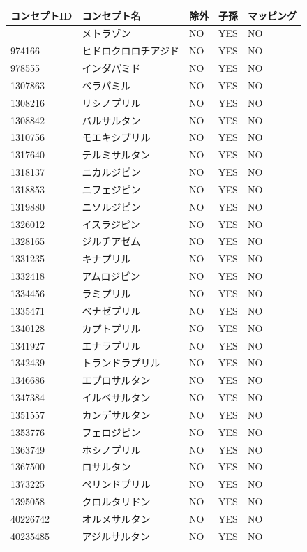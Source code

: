 \documentclass[
  11pt]{book}
\theoremstyle{definition}
\theoremstyle{definition}
\theoremstyle{definition}
\theoremstyle{definition}
\theoremstyle{remark}
\begin{document}
\begin{longtable}[]{@{}lllll@{}}
\toprule\noalign{}
コンセプトID & コンセプト名 & 除外 & 子孫 & マッピング \\
\midrule\noalign{}
\endhead
\bottomrule\noalign{}
\endlastfoot
907013 & メトラゾン & NO & YES & NO \\
974166 & ヒドロクロロチアジド & NO & YES & NO \\
978555 & インダパミド & NO & YES & NO \\
1307863 & ベラパミル & NO & YES & NO \\
1308216 & リシノプリル & NO & YES & NO \\
1308842 & バルサルタン & NO & YES & NO \\
1310756 & モエキシプリル & NO & YES & NO \\
1317640 & テルミサルタン & NO & YES & NO \\
1318137 & ニカルジピン & NO & YES & NO \\
1318853 & ニフェジピン & NO & YES & NO \\
1319880 & ニソルジピン & NO & YES & NO \\
1326012 & イスラジピン & NO & YES & NO \\
1328165 & ジルチアゼム & NO & YES & NO \\
1331235 & キナプリル & NO & YES & NO \\
1332418 & アムロジピン & NO & YES & NO \\
1334456 & ラミプリル & NO & YES & NO \\
1335471 & ベナゼプリル & NO & YES & NO \\
1340128 & カプトプリル & NO & YES & NO \\
1341927 & エナラプリル & NO & YES & NO \\
1342439 & トランドラプリル & NO & YES & NO \\
1346686 & エプロサルタン & NO & YES & NO \\
1347384 & イルベサルタン & NO & YES & NO \\
1351557 & カンデサルタン & NO & YES & NO \\
1353776 & フェロジピン & NO & YES & NO \\
1363749 & ホシノプリル & NO & YES & NO \\
1367500 & ロサルタン & NO & YES & NO \\
1373225 & ペリンドプリル & NO & YES & NO \\
1395058 & クロルタリドン & NO & YES & NO \\
40226742 & オルメサルタン & NO & YES & NO \\
40235485 & アジルサルタン & NO & YES & NO \\
\end{longtable}
\end{document}
